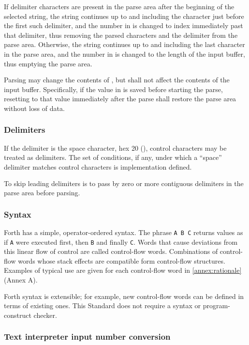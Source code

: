 If delimiter characters are present in the parse area after the
beginning of the selected string, the string continues up to and
including the character just before the first such delimiter, and
the number in  is changed to index immediately past that
delimiter, thus removing the parsed characters and the delimiter
from the parse area. Otherwise, the string continues up to and
including the last character in the parse area, and the number in
 is changed to the length of the input buffer, thus
emptying the parse area.

Parsing may change the contents of , but shall not affect
the contents of the input buffer. Specifically, if the value in
 is saved before starting the parse, resetting 
to that value immediately after the parse shall restore the parse
area without loss of data.

\subsubsection{Delimiters} %
\label{usage:delim}

If the delimiter is the space character, hex 20 (), control
characters may be treated as delimiters. The set of conditions, if
any, under which a ``space'' delimiter matches control characters is
implementation defined.

To skip leading delimiters is to pass by zero or more contiguous
delimiters in the parse area before parsing.

\subsubsection{Syntax} %
\label{usage:syntax}

Forth has a simple, operator-ordered syntax. The phrase
\texttt{A B C} returns values as if \texttt{A} were executed first,
then \texttt{B} and finally \texttt{C}. Words that cause deviations
from this linear flow of control are called control-flow words.
Combinations of control-flow words whose stack effects are
compatible form control-flow structures. Examples of typical use are
given for each control-flow word in \ref{annex:rationale} (Annex A).

Forth syntax is extensible; for example, new control-flow words can
be defined in terms of existing ones. This Standard does not require
a syntax or program-construct checker.

\subsubsection{Text interpreter input number conversion} %
\label{usage:numbers}

